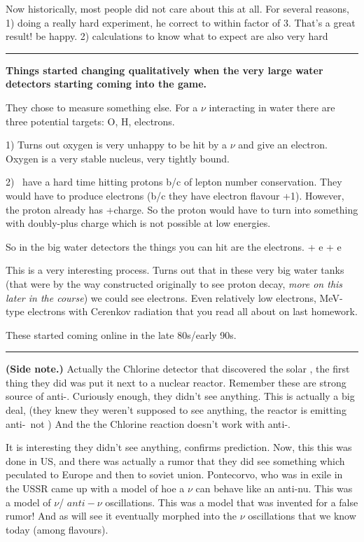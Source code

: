 {Now historically, most people did not care about this at all.
For several reasons, 
1) doing a really hard experiment, he correct to within factor of 3. That's a great result! be happy. 
2) calculations to know what to expect are also very hard 

\noindent\rule{\textwidth}{1pt}

\textbf{Things started changing qualitatively when the very large water detectors starting coming into the game. }

They chose to measure something else.
For a $\nu$ interacting in water there are three potential targets:  O, H, electrons.

1) Turns out oxygen is very unhappy to be hit by a $\nu$ and give an electron. 
Oxygen is a very stable nucleus, very tightly bound.

2) \nus\ have a hard time hitting protons b/c of lepton number conservation. 
They would have to produce electrons (b/c they have electron flavour +1). 
However, the proton already has +charge.  
So the proton would have to turn into something with doubly-plus charge which is not possible at low energies. 

So in the big water detectors the things you can hit are the electrons. 
\be
\nu + e \rightarrow \nu + e
\ee

This is a very interesting process.
Turns out that in these very big water tanks (that were by the way constructed originally to see proton decay, \textit{more on this later in the course}) we could see electrons.
Even relatively low electrons, MeV-type electrons with Cerenkov radiation that you read all about on last homework.

These started coming online in the late 80s/early 90s.

\noindent\rule{\textwidth}{1pt}

\textbf{(Side note.)}
Actually the Chlorine detector that discovered the solar \nus, the first thing they did was put it next to a nuclear reactor.
Remember these are strong source of anti-\nus.
Curiously enough, they didn't see anything.
This is actually a big deal, (they knew they weren't supposed to see anything, the reactor is emitting anti-\nus\ not \nus) 
And the the Chlorine reaction doesn't work with anti-\nus. 

It is interesting they didn't see anything, confirms prediction. 
Now, this this was done in US, and there was actually a rumor that they did see something which peculated to Europe and then to soviet union. 
Pontecorvo, who was in exile in the USSR came up with a model of hoe a $\nu$ can behave like an anti-nu.
This was a model of $\nu$/ $anti-\nu$ oscillations. 
This was a model that was invented for a false rumor! 
And as will see it eventually morphed into the $\nu$ oscillations that we know today (among flavours). 

}

